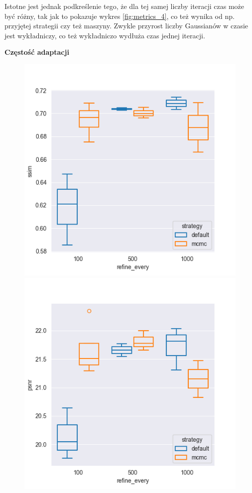 Istotne jest jednak podkreślenie tego, że dla tej samej liczby iteracji czas może być różny, tak jak to pokazuje wykres \ref{fig:metrics_4}, co też wynika od np. przyjętej strategii czy też maszyny. Zwykle przyrost liczby Gaussianów w czasie jest wykładniczy, co też wykładniczo wydłuża czas jednej iteracji. 

\textbf{Częstość adaptacji}


\begin{figure}[h!]
    \centering
    \begin{minipage}{0.3\textwidth}
        \centering
        \includegraphics[width=\textwidth]{img/gs_metrics/ssim_refine_every.png}
    \end{minipage}
    \hfill
    \begin{minipage}{0.3\textwidth}
        \centering
        \includegraphics[width=\textwidth]{img/gs_metrics/psnr_refine_every.png}

\end{minipage}
\end{figure}
